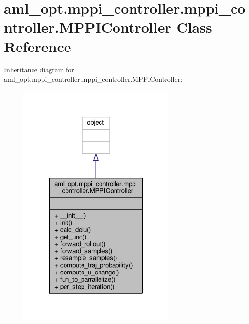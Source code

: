 \hypertarget{classaml__opt_1_1mppi__controller_1_1mppi__controller_1_1_m_p_p_i_controller}{\section{aml\-\_\-opt.\-mppi\-\_\-controller.\-mppi\-\_\-controller.\-M\-P\-P\-I\-Controller Class Reference}
\label{classaml__opt_1_1mppi__controller_1_1mppi__controller_1_1_m_p_p_i_controller}
}


Inheritance diagram for aml\-\_\-opt.\-mppi\-\_\-controller.\-mppi\-\_\-controller.\-M\-P\-P\-I\-Controller\-:\nopagebreak
\begin{figure}[H]
\begin{center}
\leavevmode
\includegraphics[width=224pt]{classaml__opt_1_1mppi__controller_1_1mppi__controller_1_1_m_p_p_i_controller__inherit__graph}
\end{center}
\end{figure}


